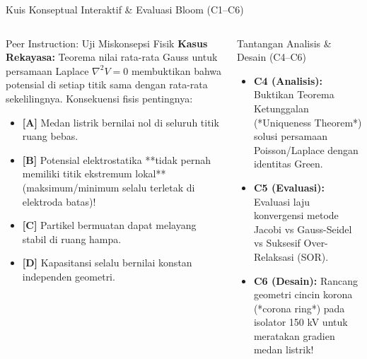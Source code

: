 \documentclass[aspectratio=169,10pt]{beamer}
\begin{document}
\begin{frame}{Kuis Konseptual Interaktif \& Evaluasi Bloom (C1--C6)}
  \begin{columns}[t]
    \begin{alertblock}{Peer Instruction: Uji Miskonsepsi Fisik}
      \footnotesize
      \textbf{Kasus Rekayasa:} Teorema nilai rata-rata Gauss untuk persamaan Laplace $\nabla^2 V = 0$ membuktikan bahwa potensial di setiap titik sama dengan rata-rata sekelilingnya. Konsekuensi fisis pentingnya:
      \vspace{0.05cm}
      \begin{itemize}\setlength{\itemsep}{1pt}
        \item \textbf{[A]} Medan listrik bernilai nol di seluruh titik ruang bebas.
        \item \textbf{[B]} Potensial elektrostatika **tidak pernah memiliki titik ekstremum lokal** (maksimum/minimum selalu terletak di elektroda batas)!
        \item \textbf{[C]} Partikel bermuatan dapat melayang stabil di ruang hampa.
        \item \textbf{[D]} Kapasitansi selalu bernilai konstan independen geometri.
      \end{itemize}
    \end{alertblock}

    \begin{block}{Tantangan Analisis \& Desain (C4--C6)}
      \footnotesize
      \begin{itemize}\setlength{\itemsep}{2pt}
        \item \textbf{C4 (Analisis):} Buktikan Teorema Ketunggalan (*Uniqueness Theorem*) solusi persamaan Poisson/Laplace dengan identitas Green.
        \item \textbf{C5 (Evaluasi):} Evaluasi laju konvergensi metode Jacobi vs Gauss-Seidel vs Suksesif Over-Relaksasi (SOR).
        \item \textbf{C6 (Desain):} Rancang geometri cincin korona (*corona ring*) pada isolator 150 kV untuk meratakan gradien medan listrik!
      \end{itemize}
    \end{block}
  \end{columns}
\end{frame}
\end{document}
